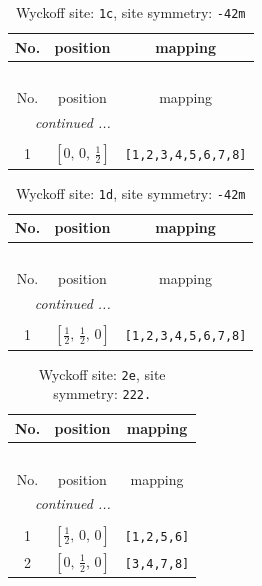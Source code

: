 \documentclass[fleqn,8pt]{jsarticle}
\begin{document}
\begin{longtable}{ccc}
\caption{Wyckoff site: {\tt 1c}, site symmetry: {\tt -42m}}
 \\
 \hline \hline
No. & position & mapping \\ \hline \endfirsthead

\multicolumn{2}{l}{\tablename\ \thetable{}} \\
 \hline \hline
No. & position & mapping \\ \hline \endhead

 \hline \hline
\multicolumn{2}{r}{\footnotesize\it continued ...} \\ \endfoot

 \hline \hline
\multicolumn{2}{r}{} \\ \endlastfoot

1 & $\left[ 0,\, 0,\, \frac{1}{2} \right]$ & {\tt [1,2,3,4,5,6,7,8]} \\
\end{longtable}
\renewcommand{\arraystretch}{1.2}
\begin{longtable}{ccc}
\caption{Wyckoff site: {\tt 1d}, site symmetry: {\tt -42m}}
 \\
 \hline \hline
No. & position & mapping \\ \hline \endfirsthead

\multicolumn{2}{l}{\tablename\ \thetable{}} \\
 \hline \hline
No. & position & mapping \\ \hline \endhead

 \hline \hline
\multicolumn{2}{r}{\footnotesize\it continued ...} \\ \endfoot

 \hline \hline
\multicolumn{2}{r}{} \\ \endlastfoot

1 & $\left[ \frac{1}{2},\, \frac{1}{2},\, 0 \right]$ & {\tt [1,2,3,4,5,6,7,8]} \\
\end{longtable}
\renewcommand{\arraystretch}{1.2}
\begin{longtable}{ccc}
\caption{Wyckoff site: {\tt 2e}, site symmetry: {\tt 222.}}
 \\
 \hline \hline
No. & position & mapping \\ \hline \endfirsthead

\multicolumn{2}{l}{\tablename\ \thetable{}} \\
 \hline \hline
No. & position & mapping \\ \hline \endhead

 \hline \hline
\multicolumn{2}{r}{\footnotesize\it continued ...} \\ \endfoot

 \hline \hline
\multicolumn{2}{r}{} \\ \endlastfoot

1 & $\left[ \frac{1}{2},\, 0,\, 0 \right]$ & {\tt [1,2,5,6]} \\ \hline
2 & $\left[ 0,\, \frac{1}{2},\, 0 \right]$ & {\tt [3,4,7,8]} \\
\end{longtable}
\end{document}

